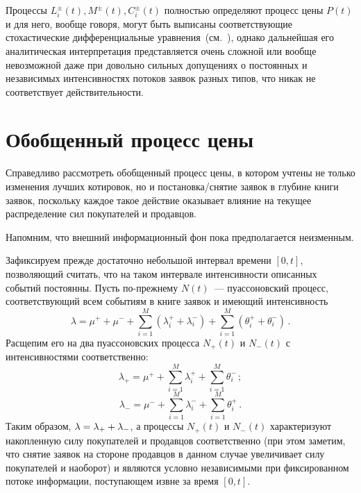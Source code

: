 \begin{multicols}{2}
Процессы $L^{\pm}_{i}(t), M^{\pm}(t), C^{\pm}_{i}(t)$ полностью
определяют процесс цены $P(t)$ и для него, вообще говоря, могут быть
выписаны соответствующие стохастические дифференциальные 
уравнения~(см.~\cite{AbergelJedidi2011}), %
однако дальнейшая его аналитическая
интерпретация представляется очень сложной или вообще невозможной
даже при довольно сильных допущениях о постоянных и независимых
интенсивностях потоков заявок разных типов, что никак не
соответствует действительности.

\section{Обобщенный процесс цены}

Справедливо рассмотреть обобщенный процесс цены, в котором учтены не
только изменения лучших котировок, но и по\-ста\-нов\-ка/сня\-тие заявок в
глубине книги заявок, поскольку каждое такое действие оказывает
влияние на текущее распределение сил покупателей и продавцов.

Напомним, что внешний информационный фон пока предполагается
неизменным.

Зафиксируем прежде достаточно небольшой интервал времени $[0, t]$,
позволяющий считать, что на таком интервале интенсивности описанных
событий постоянны. Пусть по-преж\-не\-му $N(t)$~--- пуассоновский
процесс, соответствующий всем событиям в книге заявок и имеющий
интенсивность
$$
\lambda = \mu^{+} + \mu^{-} + \sum\limits_{i = 1}^{M} (\lambda_i^{+} +
\lambda_i^{-}) + \sum\limits_{i = 1}^{M} (\theta_i^{+} + \theta_i^{-})\,.
$$
Расщепим его на два пуассоновских процесса $N_+(t)$ и $N_-(t)$ с
интенсивностями соответственно:
$$
\lambda_+ = \mu^{+} + \sum\limits_{i=1}^M \lambda_i^{+} + \sum\limits_{i=1}^M
\theta_i^{-}\,;
$$
$$
\lambda_- = \mu^{-} + \sum\limits_{i=1}^M \lambda_i^{-} + \sum\limits_{i=1}^M
\theta_i^{+}\,.
$$
Таким образом, $\lambda = \lambda_+ \hm+ \lambda_-$, а процессы
$N_+(t)$ и $N_-(t)$ характеризуют накопленную силу покупателей и
продавцов соответственно (при этом заметим, что снятие заявок на
стороне продавцов в данном случае увеличивает силу покупателей и
наоборот) и являются условно независимыми при фиксированном потоке
информации, поступающем извне за время $[0, t]$.


\end{multicols}
